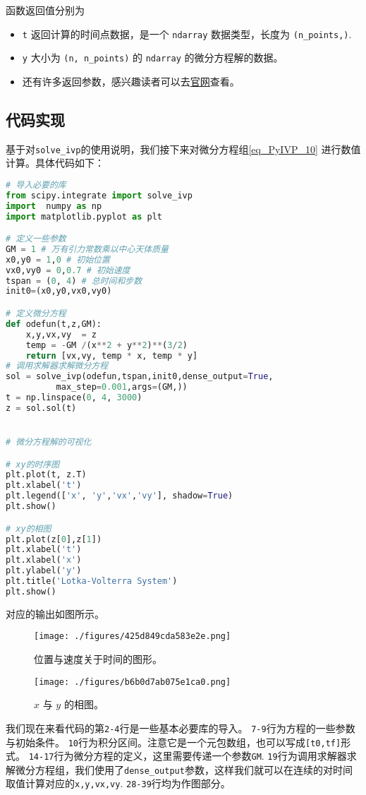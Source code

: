 函数返回值分别为
\begin{itemize}
\item  \verb|t| 返回计算的时间点数据，是一个 \verb|ndarray| 数据类型，长度为 \verb|(n_points,)|.
\item \verb|y| 大小为 \verb|(n, n_points)| 的 \verb|ndarray| 的微分方程解的数据。
\item 还有许多返回参数，感兴趣读者可以去\href{https://scipy.github.io/devdocs/reference/generated/scipy.integrate.solve_ivp.html#r179348322575-7}{官网}查看。
\end{itemize}


\subsection{代码实现}
基于对\verb|solve_ivp|的使用说明，我们接下来对微分方程组\ref{eq_PyIVP_10} 进行数值计算。具体代码如下：
\begin{lstlisting}[language=python]
# 导入必要的库
from scipy.integrate import solve_ivp
import  numpy as np
import matplotlib.pyplot as plt

# 定义一些参数
GM = 1 # 万有引力常数乘以中心天体质量
x0,y0 = 1,0 # 初始位置
vx0,vy0 = 0,0.7 # 初始速度
tspan = (0, 4) # 总时间和步数
init0=(x0,y0,vx0,vy0)

# 定义微分方程
def odefun(t,z,GM):
    x,y,vx,vy  = z
    temp = -GM /(x**2 + y**2)**(3/2)
    return [vx,vy, temp * x, temp * y]
# 调用求解器求解微分方程
sol = solve_ivp(odefun,tspan,init0,dense_output=True,
          max_step=0.001,args=(GM,))
t = np.linspace(0, 4, 3000)
z = sol.sol(t)


# 微分方程解的可视化

# xy的时序图
plt.plot(t, z.T)
plt.xlabel('t')
plt.legend(['x', 'y','vx','vy'], shadow=True)
plt.show()

# xy的相图
plt.plot(z[0],z[1])
plt.xlabel('t')
plt.xlabel('x')
plt.ylabel('y')
plt.title('Lotka-Volterra System')
plt.show()
\end{lstlisting}

对应的输出如图所示。
\begin{figure}[ht]
\centering
\texttt{[image: ./figures/425d849cda583e2e.png]}
\caption{位置与速度关于时间的图形。} \label{fig_PyIVP_1}
\end{figure}

\begin{figure}[ht]
\centering
\texttt{[image: ./figures/b6b0d7ab075e1ca0.png]}
\caption{$x$ 与 $y$ 的相图。} \label{fig_PyIVP_2}
\end{figure}

我们现在来看代码的第\verb|2-4|行是一些基本必要库的导入。 
\verb|7-9|行为方程的一些参数与初始条件。
\verb|10|行为积分区间。注意它是一个元包数组，也可以写成\verb|[t0,tf]|形式。
\verb|14-17|行为微分方程的定义，这里需要传递一个参数\verb|GM|.
\verb|19|行为调用求解器求解微分方程组，我们使用了\verb|dense_output|参数，这样我们就可以在连续的对时间取值计算对应的\verb|x,y,vx,vy|. 
\verb|28-39|行均为作图部分。

